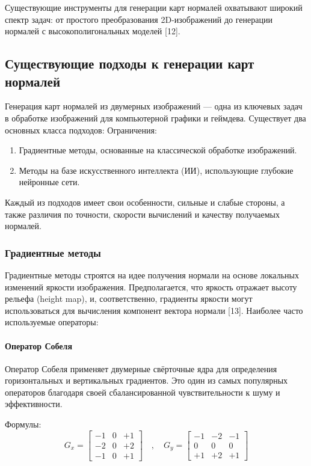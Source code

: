 Существующие инструменты для генерации карт нормалей охватывают широкий спектр задач: от простого преобразования 2D-изображений до генерации нормалей с высокополигональных моделей [12].
\subsection{Существующие подходы к генерации карт нормалей}

Генерация карт нормалей из двумерных изображений — одна из ключевых задач в обработке изображений для компьютерной графики и геймдева. Существует два основных класса подходов:
Ограничения:
\begin{enumerate}
	\item Градиентные методы, основанные на классической обработке изображений.
	\item Методы на базе искусственного интеллекта (ИИ), использующие глубокие нейронные сети.
\end{enumerate}

Каждый из подходов имеет свои особенности, сильные и слабые стороны, а также различия по точности, скорости вычислений и качеству получаемых нормалей.
\subsubsection{Градиентные методы}

Градиентные методы строятся на идее получения нормали на основе локальных изменений яркости изображения. Предполагается, что яркость отражает высоту рельефа (height map), и, соответственно, градиенты яркости могут использоваться для вычисления компонент вектора нормали [13]. Наиболее часто используемые операторы:
\paragraph{Оператор Собеля}

Оператор Собеля применяет двумерные свёрточные ядра для определения горизонтальных и вертикальных градиентов. Это один из самых популярных операторов благодаря своей сбалансированной чувствительности к шуму и эффективности.

Формулы:
\[
G_x =
\begin{bmatrix}
	-1 & 0 & +1 \\
	-2 & 0 & +2 \\
	-1 & 0 & +1
\end{bmatrix}
\quad , \quad
G_y =
\begin{bmatrix}
	-1 & -2 & -1 \\
	0 & 0 & 0 \\
	+1 & +2 & +1
\end{bmatrix}
\]

